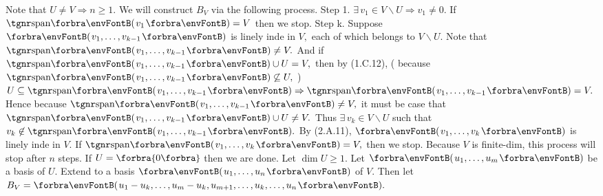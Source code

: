 \TextB{\vspace{0pt}}
Note that $U\neq V\Rightarrow n\geqslant 1.$ We will construct $B_V$ via the following process.\TextB{}
{\tgbfx Step 1.} $\exists\,v_1\in V\backslash U\Rightarrow v_1\neq 0.$ If $\Span{v_1}=V$ then we stop.\TextB{}
{\tgbfx Step k.} Suppose $\Par{v_1,\dots,v_{k-1}}$ is linely inde in $V,$ each of which belongs to $V\backslash U.$\TextB{}
 Note that $\Span{v_1,\dots,v_{k-1}}\neq V.$ And if $\Span{v_1,\dots,v_{k-1}}\cup U=V,$ then by (1.C.12),\TextB{}
 ( because $\Span{v_1,\dots,v_{k-1}}\not\subseteq U,$ ) $U\subseteq \Span{v_1,\dots,v_{k-1}}\Rightarrow\Span{v_1,\dots,v_{k-1}}=V.$\TextB{}
 Hence because $\Span{v_1,\dots,v_{k-1}}\neq V,$ it must be case that $\Span{v_1,\dots,v_{k-1}}\cup U\neq V.$\TextB{}
 Thus $\exists\,v_k\in V\backslash U$ such that $v_k\not\in\Span{v_1,\dots,v_{k-1}}.$\TextB{}
 By (2.A.11), $\Par{v_1,\dots,v_k}$ is linely inde in $V$. If $\Span{v_1,\dots,v_k}=V,$ then we stop.\TextB{}
Because $V$ is finite-dim, this process will stop after $n$ steps.\PfEnd\vspace{4pt}\TextB{}
\Or If $U=\zeroSubs$ then we are done. Let $\dim U\geqslant 1.$\TextB{}
Let $\Par{u_1,\dots,u_m}$ be a basis of $U.$ Extend to a basis $\Par{u_1,\dots,u_n}$ of $V.$\TextB{}
Then let $B_V=\Par{u_1-u_k,\dots,u_m-u_k,u_{m+1},\dots,u_k,\dots,u_n}.$\PfEnd
\SepLine\pagebreak

